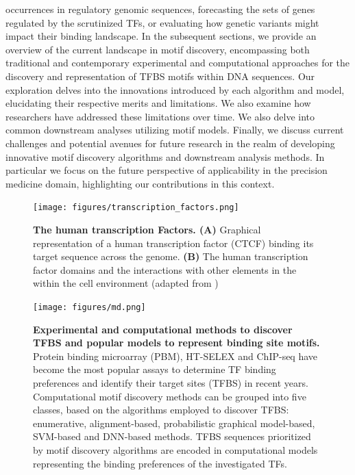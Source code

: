 \documentclass[a4paper, titlepage, openright]{book}
\begin{document}
occurrences in regulatory genomic sequences, forecasting the sets of genes regulated by the scrutinized TFs, or evaluating how genetic variants might impact their binding landscape. In the subsequent sections, we provide an overview of the current landscape in motif discovery, encompassing both traditional and contemporary experimental and computational approaches for the discovery and representation of TFBS motifs within DNA sequences. Our exploration delves into the innovations introduced by each algorithm and model, elucidating their respective merits and limitations. We also examine how researchers have addressed these limitations over time. We also delve into common downstream analyses utilizing motif models. Finally, we discuss current challenges and potential avenues for future research in the realm of developing innovative motif discovery algorithms and downstream analysis methods. In particular we focus on the future perspective of applicability in the precision medicine domain, highlighting our contributions in this context.

\begin{figure}
	\centering
	\texttt{[image: figures/transcription\_factors.png]}
	\caption[The human transcription Factors]{\textbf{The human transcription Factors. (A)} Graphical representation of a human transcription factor (CTCF) binding its target sequence across the genome. \textbf{(B)} The human transcription factor domains and the interactions with other elements in the within the cell environment (adapted from \cite{lambert2018human})}
	\label{fig:transcription_factors}
\end{figure}

\begin{figure}
	\centering
	\texttt{[image: figures/md.png]}
	\caption[Experimental and computational methods to discover TFBS and popular models to represent binding site motifs]{\textbf{Experimental and computational methods to discover TFBS and popular models to represent binding site motifs.} Protein binding microarray (PBM), HT-SELEX and ChIP-seq have become the most popular assays to determine TF binding preferences and identify their target sites (TFBS) in recent years. Computational motif discovery methods can be grouped into five classes, based on the algorithms employed to discover TFBS: enumerative, alignment-based, probabilistic graphical model-based, SVM-based and DNN-based methods. TFBS sequences prioritized by motif discovery algorithms are encoded in computational models representing the binding preferences of the investigated TFs.}
	\label{fig:motif_discovery}
\end{figure}
\end{document}
